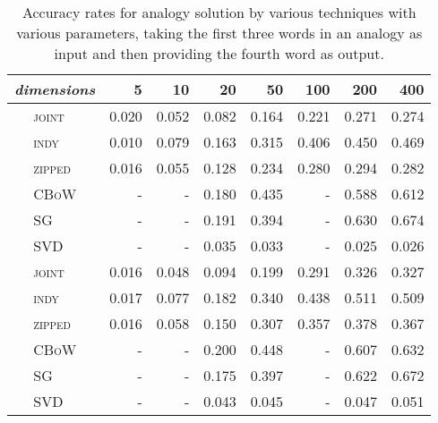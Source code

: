 \begin{table}
\centering
\begin{tabular}{clrrrrrrr}
\hline
\multicolumn{2}{l}{\emph{dimensions}} & 5 & 10 & 20 & 50 & 100 & 200 & 400 \\
\hline
\parbox[t]{2mm}{} & \textsc{joint} & 0.020 & 0.052 & 0.082 & 0.164 & 0.221 & 0.271 & 0.274 \\
& \textsc{indy} & 0.010 & 0.079 & 0.163 & 0.315 & 0.406 & 0.450 & 0.469 \\
& \textsc{zipped} & 0.016 & 0.055 & 0.128 & 0.234 & 0.280 & 0.294 & 0.282 \\
& \textsc{CBoW} & - & - & 0.180 & 0.435 & - & 0.588 & 0.612 \\
& \textsc{SG} & - & - & 0.191 & 0.394 & - & 0.630 & 0.674 \\
& \textsc{SVD} & - & - & 0.035 & 0.033 & - & 0.025 & 0.026 \\
\hline
\parbox[t]{2mm}{} & \textsc{joint} & 0.016 & 0.048 & 0.094 & 0.199 & 0.291 & 0.326 & 0.327 \\
& \textsc{indy} & 0.017 & 0.077 & 0.182 & 0.340 & 0.438 & 0.511 & 0.509 \\
& \textsc{zipped} & 0.016 & 0.058 & 0.150 & 0.307 & 0.357 & 0.378 & 0.367 \\
& \textsc{CBoW} & - & - & 0.200 & 0.448 & - & 0.607 & 0.632 \\
& \textsc{SG} & - & - & 0.175 & 0.397 & - & 0.622 & 0.672 \\
& \textsc{SVD} & - & - & 0.043 & 0.045 & - & 0.047 & 0.051 \\
\hline
\end{tabular}
\caption[Solving Analogies]{Accuracy rates for analogy solution by various techniques with various parameters, taking the first three words in an analogy as input and then providing the fourth word as output.}
\label{tab:solutions}
\end{table}

